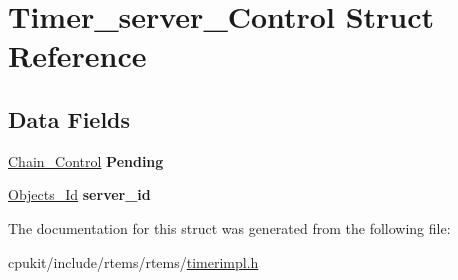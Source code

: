 \hypertarget{structTimer__server__Control}{}\section{Timer\+\_\+server\+\_\+\+Control Struct Reference}
\label{structTimer__server__Control}
\subsection*{Data Fields}
\begin{DoxyCompactItemize}
\item 
\mbox{\label{structTimer__server__Control_a12d08f61336fe05524df222a78f21976}} 
\mbox{\hyperlink{unionChain__Control}{Chain\+\_\+\+Control}} {\bfseries Pending}
\item 
\mbox{\label{structTimer__server__Control_ace56ea897de3647b083e01fedc8e8512}} 
\mbox{\hyperlink{group__RTEMSScoreObject_ga5821f52a51072941bdd603e542d0863e}{Objects\+\_\+\+Id}} {\bfseries server\+\_\+id}
\end{DoxyCompactItemize}


The documentation for this struct was generated from the following file\+:\begin{DoxyCompactItemize}
\item 
cpukit/include/rtems/rtems/\mbox{\hyperlink{rtems_2timerimpl_8h}{timerimpl.\+h}}\end{DoxyCompactItemize}
